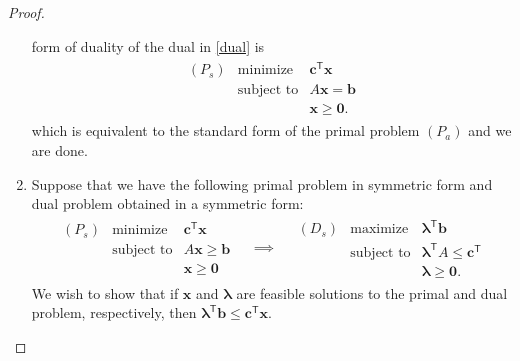 \documentclass[12pt]{article}
\theoremstyle{definition}
\newcommand{\vc}[1]{\boldsymbol{#1}}
\newcommand{\tran}{\mathsf{T}}
\begin{document}
\begin{proof}
\begin{enumerate}
      form of duality of the dual in \eqref{dual} is
      \begin{align*}
        \begin{array}{lrl}
          (P_s) & \text{minimize} & \vc{c}^\tran\vc{x} \\
          & \text{subject to} & A\vc{x} = \vc{b} \\
          & & \vc{x} \geq \vc{0}.
        \end{array}
      \end{align*}
      which is equivalent to the standard form of the primal problem $(P_a)$
      and we are done.
    \item Suppose that we have the following primal problem in symmetric form and dual problem obtained in a symmetric form:
      \begin{align*}
        \begin{array}{lrl}
          (P_s) & \text{minimize} & \vc{c}^\tran \vc{x} \\
          & \text{subject to} & A\vc{x} \geq \vc{b} \\
          & & \vc{x} \geq \vc{0}
        \end{array}
        \quad
        \implies
        \quad
        \begin{array}{lrl}
          (D_s) & \text{maximize} & \vc{\lambda}^\tran \vc{b} \\
          & \text{subject to} & \vc{\lambda}^\tran A \leq \vc{c}^\tran \\
          & & \vc{\lambda} \geq \vc{0}.
        \end{array}
      \end{align*}
      We wish to show that if $\vc{x}$ and $\vc{\lambda}$ are feasible solutions
      to the primal and dual problem, respectively, then $\vc{\lambda}^\tran \vc{b} \leq \vc{c}^\tran\vc{x}$.


\end{enumerate}
\end{proof}
\end{document}
